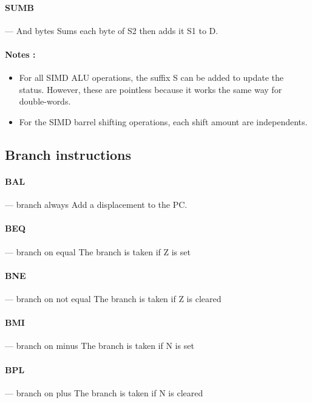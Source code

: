 \documentclass[11pt]{article}
\begin{document}
\paragraph{SUMB} --- And bytes\newline
Sums each byte of S2 then adds it S1 to D.

\paragraph{Notes : }
\begin{itemize}
    \item For all SIMD ALU operations, the suffix S can be added to update the status. 
        However, these are pointless because it works the same way for double-words.
    \item For the SIMD barrel shifting operations, each shift amount are independents. 
\end{itemize}

\subsection{Branch instructions}

\paragraph{BAL} --- branch always\newline
Add a displacement to the PC.

\paragraph{BEQ} --- branch on equal\newline
The branch is taken if Z is set

\paragraph{BNE} --- branch on not equal\newline
The branch is taken if Z is cleared

\paragraph{BMI} --- branch on minus\newline
The branch is taken if N is set

\paragraph{BPL} --- branch on plus\newline
The branch is taken if N is cleared
\end{document}

